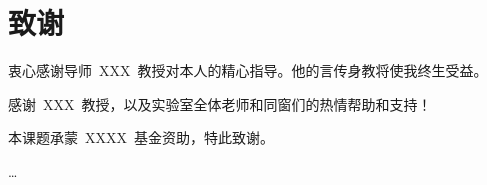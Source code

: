 \chapter*{致\quad 谢}
{}

衷心感谢导师~XXX~教授对本人的精心指导。他的言传身教将使我终生受益。

感谢~XXX~教授，以及实验室全体老师和同窗们的热情帮助和支持！

本课题承蒙~XXXX~基金资助，特此致谢。

…
